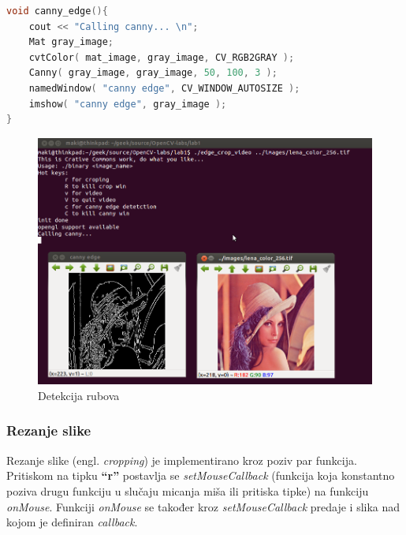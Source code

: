 \begin{lstlisting}[language=C,caption={Detekcija rubova}]
void canny_edge(){
    cout << "Calling canny... \n";
    Mat gray_image;
    cvtColor( mat_image, gray_image, CV_RGB2GRAY );
    Canny( gray_image, gray_image, 50, 100, 3 );
    namedWindow( "canny edge", CV_WINDOW_AUTOSIZE );
    imshow( "canny edge", gray_image );
}
\end{lstlisting}

\begin{figure}[h]
\centering
\includegraphics[scale=0.4]{images/lab1-01-edge.png}
\caption{Detekcija rubova}
\label{fig:lab1-01-edge}
\end{figure}

\newpage
\subsubsection{Rezanje slike}
Rezanje slike (engl. \textit{cropping}) je implementirano kroz poziv par
funkcija. Pritiskom na tipku \textbf{``r''} postavlja se
\textit{setMouseCallback} (funkcija koja konstantno poziva drugu
funkciju u slučaju micanja miša ili pritiska tipke) na funkciju
\textit{onMouse}. Funkciji \textit{onMouse} se također kroz
\textit{setMouseCallback} predaje i slika nad kojom je definiran
\textit{callback}.
\\

